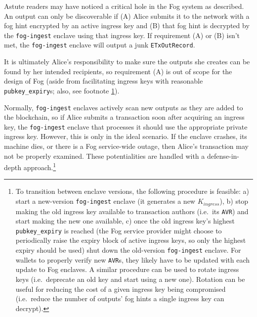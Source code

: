 Astute readers may have noticed a critical hole in the Fog system as described. An output can only be discoverable if (A) Alice submits it to the network with a fog hint encrypted by an active ingress key and (B) that fog hint is decrypted by the {\tt fog-ingest} enclave using that ingress key. If requirement (A) or (B) isn't met, the {\tt fog-ingest} enclave will output a junk {\tt ETxOutRecord}.

It is ultimately Alice's responsibility to make sure the outputs she creates can be found by her intended recipients, so requirement (A) is out of scope for the design of Fog (aside from facilitating ingress keys with reasonable {\tt pubkey\_expiry}s; also, see footnote \ref{footnote:fog-ingest-enclave-version-transition}).

Normally, {\tt fog-ingest} enclaves actively scan new outputs as they are added to the blockchain, so if Alice submits a transaction soon after acquiring an ingress key, the {\tt fog-ingest} enclave that processes it should use the appropriate private ingress key. However, this is only in the ideal scenario. If the enclave crashes, its machine dies, or there is a Fog service-wide outage, then Alice's transaction may not be properly examined. These potentialities are handled with a defense-in-depth approach.\footnote{\label{footnote:fog-ingest-enclave-version-transition}To transition between enclave versions, the following procedure is feasible: a) start a new-version {\tt fog-ingest} enclave (it generates a new $K_{ingress}$), b) stop making the old ingress key available to transaction authors (i.e.\ its {\tt AVR}) and start making the new one available, c) once the old ingress key's highest {\tt pubkey\_expiry} is reached (the Fog service provider might choose to periodically raise the expiry block of active ingress keys, so only the highest expiry should be used) shut down the old-version {\tt fog-ingest} enclave. For wallets to properly verify new {\tt AVR}s, they likely have to be updated with each update to Fog enclaves. A similar procedure can be used to rotate ingress keys (i.e.\ deprecate an old key and start using a new one). Rotation can be useful for reducing the cost of a given ingress key being compromised (i.e.\ reduce the number of outputs' fog hints a single ingress key can decrypt).}

